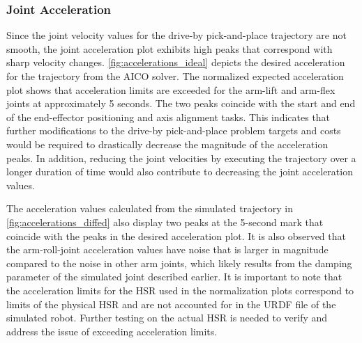 \documentclass[12pt]{article}
\begin{document}
        \subsubsection{Joint Acceleration}
            Since the joint velocity values for the drive-by pick-and-place trajectory are not smooth, the joint acceleration plot exhibits high peaks that correspond with sharp velocity changes. \cref{fig:accelerations_ideal} depicts the desired acceleration for the trajectory from the AICO solver. The normalized expected acceleration plot shows that acceleration limits are exceeded for the arm-lift and arm-flex joints at approximately 5 seconds. The two peaks coincide with the start and end of the end-effector positioning and axis alignment tasks. This indicates that further modifications to the drive-by pick-and-place problem targets and costs would be required to drastically decrease the magnitude of the acceleration peaks. In addition, reducing the joint velocities by executing the trajectory over a longer duration of time would also contribute to decreasing the joint acceleration values.
            \par The acceleration values calculated from the simulated trajectory in \cref{fig:accelerations_diffed} also display two peaks at the 5-second mark that coincide with the peaks in the desired acceleration plot. It is also observed that the arm-roll-joint acceleration values have noise that is larger in magnitude compared to the noise in other arm joints, which likely results from the damping parameter of the simulated joint described earlier. It is important to note that the acceleration limits for the HSR used in the normalization plots correspond to limits of the physical HSR and are not accounted for in the URDF file of the simulated robot. Further testing on the actual HSR is needed to verify and address the issue of exceeding acceleration limits.
\end{document}

